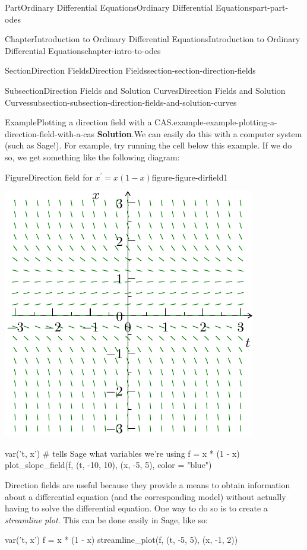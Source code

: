 \documentclass[twoside,10pt,]{book}
\newcommand{\blocktitlefont}{\relax}
\numberwithin{equation}{part}
\begin{document}
\begin{partptx}{Part}{Ordinary Differential Equations}{}{Ordinary Differential Equations}{}{}{part-part-odes}
\begin{chapterptx}{Chapter}{Introduction to Ordinary Differential Equations}{}{Introduction to Ordinary Differential Equations}{}{}{chapter-intro-to-odes}
\begin{sectionptx}{Section}{Direction Fields}{}{Direction Fields}{}{}{section-section-direction-fields}
\begin{subsectionptx}{Subsection}{Direction Fields and Solution Curves}{}{Direction Fields and Solution Curves}{}{}{subsection-subsection-direction-fields-and-solution-curves}
\begin{example}{Example}{Plotting a direction field with a CAS.}{example-example-plotting-a-direction-field-with-a-cas}
\noindent\textbf{\blocktitlefont Solution}.\hypertarget{solution-example-plotting-a-direction-field-with-a-cas-c}{}\quad{}We can easily do this with a computer system (such as Sage!). For example, try running the cell below this example. If we do so, we get something like the following diagram:%
\begin{figureptx}{Figure}{Direction field for \(x^\prime = x(1-x)\)}{figure-figure-dirfield1}{}%
\begin{image}{0.25}{0.5}{0.25}{}%
\includegraphics[width=\linewidth]{generated/asymptote/image-4.pdf}
\end{image}%
\tcblower
\end{figureptx}%
\end{example}
\begin{sageinput}
var('t, x')    # tells Sage what variables we're using
f = x * (1 - x)
plot_slope_field(f, (t, -10, 10), (x, -5, 5), color = "blue")
\end{sageinput}
Direction fields are useful because they provide a means to obtain information about a differential equation (and the corresponding model) without actually having to solve the differential equation. One way to do so is to create a \emph{streamline plot}. This can be done easily in Sage, like so: \begin{sageinput}
var('t, x')
f = x * (1 - x)
streamline_plot(f, (t, -5, 5), (x, -1, 2))

\end{sageinput}
\end{subsectionptx}
\end{sectionptx}
\end{chapterptx}
\end{partptx}
\end{document}
